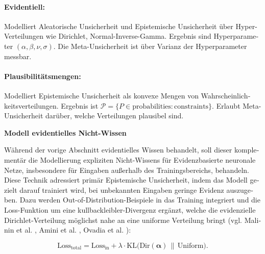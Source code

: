 \begin{otherlanguage}{ngerman}
\paragraph{Evidentiell:} Modelliert \gls{Aleatorische Unsicherheit} und \gls{Epistemische Unsicherheit} über Hyper-Verteilungen wie Dirichlet, Normal-Inverse-Gamma. Ergebnis sind  Hyperparameter \((\alpha, \beta, \nu, \sigma)\). Die Meta-Unsicherheit ist über Varianz der Hyperparameter messbar.

\paragraph{Plausibilitätsmengen:} Modelliert \gls{Epistemische Unsicherheit} als konvexe Mengen von Wahrscheinlichkeitsverteilungen. Ergebnis ist  
\(\mathcal{P} = \{ P \in \text{probabilities} : \text{constraints} \}\). Erlaubt Meta-Unsicherheit darüber, welche Verteilungen plausibel sind.

\par\vspace{1\baselineskip}\noindent



\textbf{Modell evidentielles Nicht-Wissen}

Während der vorige Abschnitt evidentielles Wissen behandelt, soll dieser komplementär die Modellierung expliziten Nicht-Wissens für \gls{Evidenzbasierte neuronale Netze}, insbesondere für Eingaben außerhalb des Trainingsbereichs, behandeln. Diese Technik adressiert primär \gls{Epistemische Unsicherheit}, indem das Modell gezielt darauf trainiert wird, bei unbekannten Eingaben geringe Evidenz auszugeben. Dazu werden \gls{Out-of-Distribution}-Beispiele in das Training integriert und die Loss-Funktion um eine \gls{kullbackleibler}-Divergenz ergänzt, welche die evidenzielle Dirichlet-Verteilung möglichst nahe an eine uniforme Verteilung bringt (vgl. Malinin et al. \parencite[S.3, Z.22-28]{malinin2019uncertainty}, Amini et al. \parencite[S.4, Z.10-16]{amini2020deep}, Ovadia et al. \parencite[S.4, Z.5-15]{ovadia2019can}):

\begin{equation}
\text{Loss}_{\text{total}} 
= \text{Loss}_{\text{in}} 
+ \lambda \cdot \text{KL}\bigl(\text{Dir}(\boldsymbol{\alpha}) \,\|\, \text{Uniform}\bigr).
\end{equation}


\end{otherlanguage}
